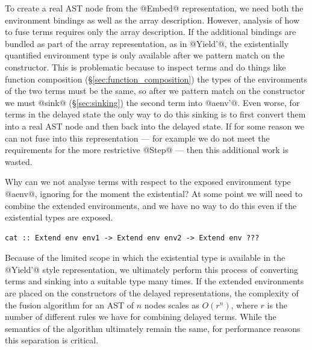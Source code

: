 To create a real AST node from the @Embed@
representation, we need both the environment bindings as well as the array
description. However, analysis of how to fuse terms requires only the array
description. If the additional bindings are bundled as part of the array
representation, as in @Yield'@, the existentially quantified environment
type is only available after we pattern match on the constructor. This is
problematic because to inspect terms and do things like function composition
(\S\ref{sec:function_composition}) the types of the environments of the two
terms must be the same, so after we pattern match on the constructor we must
@sink@ (\S\ref{sec:sinking}) the second term into @aenv'@. Even worse,
for terms in the delayed state the only way to do this sinking is to first
convert them into a real AST node and then back into the delayed state. If for
some reason we can not fuse into this representation --- for example we do not
meet the requirements for the more restrictive @Step@ --- then this
additional work is wasted.

Why can we not analyse terms with respect to the exposed environment type
@aenv@, ignoring for the moment the existential? At some point we will need
to combine the extended environments, and we have no way to do this even if the
existential types are exposed.
%
\begin{lstlisting}[style=haskell]
cat :: Extend env env1 -> Extend env env2 -> Extend env ???
\end{lstlisting}

Because of the limited scope in which the existential type is available in the
@Yield'@ style representation, we ultimately perform this process of converting
terms and sinking into a suitable type many times. If the extended environments
are placed on the constructors of the delayed representations, the complexity of
the fusion algorithm for an AST of $n$ nodes scales as $O(r^n)$, where $r$ is
the number of different rules we have for combining delayed terms. While the
semantics of the algorithm ultimately remain the same, for performance reasons
this separation is critical.

